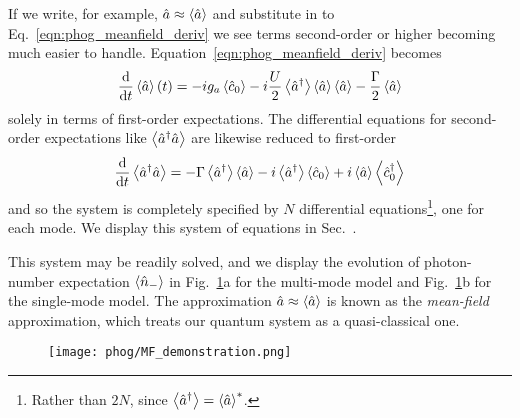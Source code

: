 If we write, for example, $\hat{a} \approx \ev{\hat{a}}$ and substitute in to Eq.~\ref{eqn:phog_meanfield_deriv} we see terms second-order or higher becoming much easier to handle. Equation~\ref{eqn:phog_meanfield_deriv} becomes
\begin{equation}\label{eqn:phog_meanfield_deriv_1}
\ddt \ev{\hat{a}}\left(t\right) = - i g_a \ev{\hat{c}_0} - i \frac{U}{2} \ev{\hat{a}^\dagger} \ev{\hat{a}} \ev{\hat{a}} - \frac{\Gamma}{2} \ev{\hat{a}}
\end{equation}
solely in terms of first-order expectations. The differential equations for second-order expectations like $\ev{\hat{a}^\dagger \hat{a}}$ are likewise reduced to first-order
\begin{equation}
\ddt \ev{\hat{a}^\dagger \hat{a}} = - \Gamma \ev{\hat{a}^\dagger}\ev{\hat{a}} - i \ev{\hat{a}^\dagger}\ev{\hat{c}_0} + i \ev{\hat{a}}\ev{\hat{c}_0^\dagger}
\end{equation}
and so the system is completely specified by $N$ differential equations\footnote{Rather than $2N$, since $\ev{\hat{a}^\dagger} = \ev{\hat{a}}^*$.}, one for each mode. We display this system of equations in Sec.~. %


This system may be readily solved, and we display the evolution of photon-number expectation $\ev{\hat{n}_-}$ in Fig.~\ref{fig:phog_MF_demonstration}a for the multi-mode model and Fig.~\ref{fig:phog_MF_demonstration}b for the single-mode model. The approximation $\hat{a} \approx \ev{\hat{a}}$ is known as the \emph{mean-field} approximation, which treats our quantum system as a quasi-classical one.

\begin{figure}[htp]
\centering
\texttt{[image: phog/MF\_demonstration.png]}
\caption{\label{fig:phog_MF_demonstration}}
\end{figure}
%

